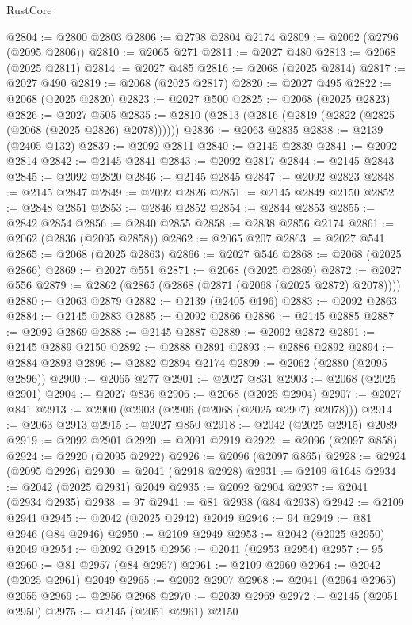 \begin{lexlean}{RustCore}
\begin{coremodule}
@2804 := @2800 @2803
@2806 := @2798 @2804 @2174
@2809 := @2062 (@2796 (@2095 @2806))
@2810 := @2065 @271
@2811 := @2027 @480
@2813 := @2068 (@2025 @2811)
@2814 := @2027 @485
@2816 := @2068 (@2025 @2814)
@2817 := @2027 @490
@2819 := @2068 (@2025 @2817)
@2820 := @2027 @495
@2822 := @2068 (@2025 @2820)
@2823 := @2027 @500
@2825 := @2068 (@2025 @2823)
@2826 := @2027 @505
@2835 := @2810 (@2813 (@2816 (@2819 (@2822 (@2825 (@2068 (@2025 @2826) @2078))))))
@2836 := @2063 @2835
@2838 := @2139 (@2405 @132)
@2839 := @2092 @2811
@2840 := @2145 @2839
@2841 := @2092 @2814
@2842 := @2145 @2841
@2843 := @2092 @2817
@2844 := @2145 @2843
@2845 := @2092 @2820
@2846 := @2145 @2845
@2847 := @2092 @2823
@2848 := @2145 @2847
@2849 := @2092 @2826
@2851 := @2145 @2849 @2150
@2852 := @2848 @2851
@2853 := @2846 @2852
@2854 := @2844 @2853
@2855 := @2842 @2854
@2856 := @2840 @2855
@2858 := @2838 @2856 @2174
@2861 := @2062 (@2836 (@2095 @2858))
@2862 := @2065 @207
@2863 := @2027 @541
@2865 := @2068 (@2025 @2863)
@2866 := @2027 @546
@2868 := @2068 (@2025 @2866)
@2869 := @2027 @551
@2871 := @2068 (@2025 @2869)
@2872 := @2027 @556
@2879 := @2862 (@2865 (@2868 (@2871 (@2068 (@2025 @2872) @2078))))
@2880 := @2063 @2879
@2882 := @2139 (@2405 @196)
@2883 := @2092 @2863
@2884 := @2145 @2883
@2885 := @2092 @2866
@2886 := @2145 @2885
@2887 := @2092 @2869
@2888 := @2145 @2887
@2889 := @2092 @2872
@2891 := @2145 @2889 @2150
@2892 := @2888 @2891
@2893 := @2886 @2892
@2894 := @2884 @2893
@2896 := @2882 @2894 @2174
@2899 := @2062 (@2880 (@2095 @2896))
@2900 := @2065 @277
@2901 := @2027 @831
@2903 := @2068 (@2025 @2901)
@2904 := @2027 @836
@2906 := @2068 (@2025 @2904)
@2907 := @2027 @841
@2913 := @2900 (@2903 (@2906 (@2068 (@2025 @2907) @2078)))
@2914 := @2063 @2913
@2915 := @2027 @850
@2918 := @2042 (@2025 @2915) @2089
@2919 := @2092 @2901
@2920 := @2091 @2919
@2922 := @2096 (@2097 @858)
@2924 := @2920 (@2095 @2922)
@2926 := @2096 (@2097 @865)
@2928 := @2924 (@2095 @2926)
@2930 := @2041 (@2918 @2928)
@2931 := @2109 @1648
@2934 := @2042 (@2025 @2931) @2049
@2935 := @2092 @2904
@2937 := @2041 (@2934 @2935)
@2938 := 97
@2941 := @81 @2938 (@84 @2938)
@2942 := @2109 @2941
@2945 := @2042 (@2025 @2942) @2049
@2946 := 94
@2949 := @81 @2946 (@84 @2946)
@2950 := @2109 @2949
@2953 := @2042 (@2025 @2950) @2049
@2954 := @2092 @2915
@2956 := @2041 (@2953 @2954)
@2957 := 95
@2960 := @81 @2957 (@84 @2957)
@2961 := @2109 @2960
@2964 := @2042 (@2025 @2961) @2049
@2965 := @2092 @2907
@2968 := @2041 (@2964 @2965) @2055
@2969 := @2956 @2968
@2970 := @2039 @2969
@2972 := @2145 (@2051 @2950)
@2975 := @2145 (@2051 @2961) @2150

\end{coremodule}
\end{lexlean}
